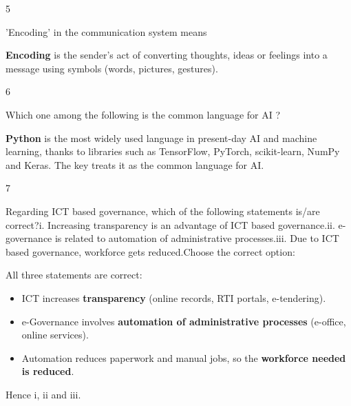 \begin{question}{5}
{'Encoding' in the communication system means\par}
\begin{explain}
\textbf{Encoding} is the sender's act of converting thoughts, ideas or feelings into a message using symbols (words, pictures, gestures).
\end{explain}
\end{question}

\begin{question}{6}
{Which one among the following is the common language for AI ?\par}
\begin{explain}
\textbf{Python} is the most widely used language in present-day AI and machine learning, thanks to libraries such as TensorFlow, PyTorch, scikit-learn, NumPy and Keras. The key treats it as the common language for AI.
\end{explain}
\end{question}

\begin{question}{7}
{Regarding ICT based governance, which of the following statements is/are correct?\newline i. Increasing transparency is an advantage of ICT based governance.\newline ii. e-governance is related to automation of administrative processes.\newline iii. Due to ICT based governance, workforce gets reduced.\newline Choose the correct option:\par}
\begin{explain}
All three statements are correct:
\begin{itemize}
\item ICT increases \textbf{transparency} (online records, RTI portals, e-tendering).
\item e-Governance involves \textbf{automation of administrative processes} (e-office, online services).
\item Automation reduces paperwork and manual jobs, so the \textbf{workforce needed is reduced}.
\end{itemize}
Hence i, ii and iii.
\end{explain}
\end{question}

